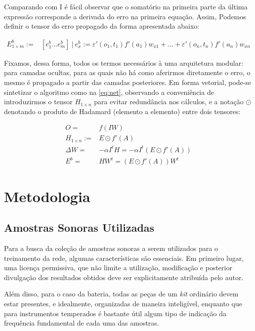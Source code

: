 \documentclass[]{article}
\begin{document}
Comparando com \(\text{I}\) é fácil observar que o somatório na primeira
parte da última expressão corresponde a derivada do erro na primeira
equação. Assim, Podemos definir o tensor do erro propagado da forma
apresentada abaixo:

\[
\begin{align}
E_{1 \times m}^b :=& [e_1^b \dots e_m^b] \ |\
e_x^b := \varepsilon' (o_1, t_1)f'(a_1)w_{x1}
+ \dots +
\varepsilon' (o_n, t_n) f'(a_n)w_{xn}
\end{align}
\]

Fixamos, dessa forma, todos os termos necessários à uma arquitetura
modular: para camadas ocultas, para as quais não há como aferirmos
diretamente o erro, o mesmo é propagado a partir das camadas
posteriores. Em forma vetorial, pode-se sintetizar o algoritmo como na
\xrefname{equação}\cref{eq:net}, observando a conveniência de
introduzirmos o tensor \(H_{1 \times n}\) para evitar redundância nos
cálculos, e a notação \(\odot\) denotando o produto de Hadamard
(elemento a elemento) entre dois tensores:

\begin{equation}
\begin{align}
O =& f(IW) \\
H_{1 \times n} :=& E \odot f'(A)\\
\Delta W =& -\alpha I^t H= - \alpha I^t (E \odot f'(A)) \\
E^b =& HW^t= (E \odot f'(A)) W^t
\end{align}
\label{eq:net}\end{equation}

\hypertarget{metodologia}{%
\section{Metodologia}\label{metodologia}}

\hypertarget{amostras-sonoras-utilizadas}{%
\subsection{Amostras Sonoras
Utilizadas}\label{amostras-sonoras-utilizadas}}

Para a busca da coleção de amostras sonoras a serem utilizados para o
treinamento da rede, algumas características são essenciais. Em primeiro
lugar, uma licença permissiva, que não limite a utilização, modificação
e posterior divulgação dos resultados obtidos deve ser explicitamente
atribuída pelo autor.

Além disso, para o caso da bateria, todas as peças de um \emph{kit}
ordinário devem estar presentes, e idealmente, organizadas de maneira
inteligível, enquanto que para instrumentos temperados é bastante útil
algum tipo de indicação da frequência fundamental de cada uma das
amostras.
\end{document}
